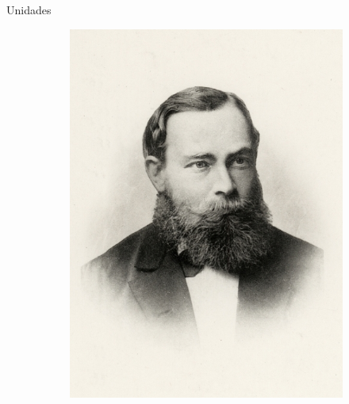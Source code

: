 \documentclass{beamer}
\begin{document}
\begin{frame}{Unidades}
\begin{figure}
    \hfill
    \begin{subfigure}{0.24\textwidth}
        \centering
        \includegraphics[width=\linewidth]{images/frege.jpg}
    \end{subfigure}
    \hfill
    \begin{subfigure}{0.24\textwidth}
        \centering

\end{subfigure}
\end{figure}
\end{frame}
\end{document}
